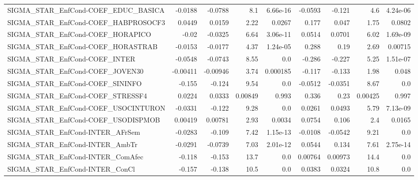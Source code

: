 \begin{tabular}{lrrrrrrrr}
SIGMA\_STAR\_EnfCond-COEF\_EDUC\_BASICA    &     -0.0188 &      -0.0788 &     8.1 & 6.66e-16 &    -0.0593 &      -0.121 &          4.6 &      4.24e-06 \\
SIGMA\_STAR\_EnfCond-COEF\_HABPROSOCF3    &      0.0449 &       0.0159 &    2.22 &   0.0267 &      0.177 &       0.047 &         1.75 &        0.0802 \\
SIGMA\_STAR\_EnfCond-COEF\_HORAPICO       &       -0.02 &      -0.0325 &    6.64 & 3.06e-11 &     0.0514 &      0.0701 &         6.02 &      1.69e-09 \\
SIGMA\_STAR\_EnfCond-COEF\_HORASTRAB      &     -0.0153 &      -0.0177 &    4.37 & 1.24e-05 &      0.288 &        0.19 &         2.69 &       0.00715 \\
SIGMA\_STAR\_EnfCond-COEF\_INTER          &     -0.0548 &      -0.0743 &    8.55 &      0.0 &     -0.286 &      -0.227 &         5.25 &      1.51e-07 \\
SIGMA\_STAR\_EnfCond-COEF\_JOVEN30        &    -0.00411 &     -0.00946 &    3.74 & 0.000185 &     -0.117 &      -0.133 &         1.98 &         0.048 \\
SIGMA\_STAR\_EnfCond-COEF\_SININFO        &      -0.155 &       -0.124 &    9.54 &      0.0 &    -0.0512 &     -0.0351 &         8.67 &           0.0 \\
SIGMA\_STAR\_EnfCond-COEF\_STRESSF4       &      0.0224 &       0.0333 & 0.00849 &    0.993 &      0.336 &        0.23 &      0.00425 &         0.997 \\
SIGMA\_STAR\_EnfCond-COEF\_USOCINTURON    &     -0.0331 &       -0.122 &    9.28 &      0.0 &     0.0261 &      0.0493 &         5.79 &      7.13e-09 \\
SIGMA\_STAR\_EnfCond-COEF\_USODISPMOB     &     0.00419 &      0.00781 &    2.93 &   0.0034 &     0.0754 &       0.106 &          2.4 &        0.0165 \\
SIGMA\_STAR\_EnfCond-INTER\_AFrSem        &     -0.0283 &       -0.109 &    7.42 & 1.15e-13 &    -0.0108 &     -0.0542 &         9.21 &           0.0 \\
SIGMA\_STAR\_EnfCond-INTER\_AmbTr         &     -0.0291 &      -0.0739 &    7.03 & 2.01e-12 &     0.0544 &       0.134 &         7.61 &      2.75e-14 \\
SIGMA\_STAR\_EnfCond-INTER\_ComAfec       &      -0.118 &       -0.153 &    13.7 &      0.0 &    0.00764 &     0.00973 &         14.4 &           0.0 \\
SIGMA\_STAR\_EnfCond-INTER\_ConCl         &      -0.157 &       -0.138 &    10.5 &      0.0 &     0.0383 &      0.0324 &         10.8 &           0.0 \\

\end{tabular}
